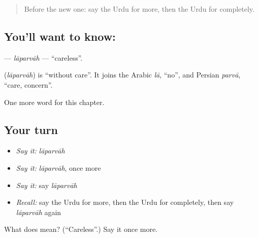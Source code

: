 \begin{quote}
Before the new one: say the Urdu for more, then the Urdu for completely.
\end{quote}

\subsection*{You'll want to know: }
\textbf{} — \emph{lāparvāh} — \textquotedblleft{}careless\textquotedblright{}.

\begin{cousinweb}
\textbf{} (\emph{lāparvāh}) is \textquotedblleft{}without care\textquotedblright{}. It joins the Arabic \emph{lā}, \textquotedblleft{}no\textquotedblright{}, and Persian \emph{parvā}, \textquotedblleft{}care, concern\textquotedblright{}.
\end{cousinweb}

\begin{grammarlens}[title={What you've built}]
One more word for this chapter.
\end{grammarlens}

\subsection*{Your turn}
\begin{itemize}
\raggedright
  \item \emph{Say it:} \emph{lāparvāh}
  \item \emph{Say it:} \emph{lāparvāh}, once more
  \item \emph{Say it:} say \emph{lāparvāh}
  \item \emph{Recall:} say the Urdu for more, then the Urdu for completely, then say \emph{lāparvāh} again
\end{itemize}

\begin{tcolorbox}[breakable,colback=teal!4,colframe=teal!35!black,title={Before you move on}]
What does  mean? (\textquotedblleft{}Careless\textquotedblright{}.) Say it once more.
\end{tcolorbox}
